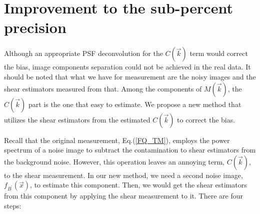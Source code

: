 \documentclass[twocolumn]{aastex62}
\begin{document}
\section{Improvement to the sub-percent precision}\label{sec:bias_corr}
Although an appropriate PSF deconvolution for the $C(\vec{k})$ term would correct the bias, image components separation could not be achieved in the real data. It should be noted that what we have for measurement are the noisy images and the shear estimators measured from that. Among the components of $M(\vec{k})$, the $C(\vec{k})$ part is the one that easy to estimate. We propose a new method that utilizes the shear estimators from the estimated $C(\vec{k})$ to correct the bias. 

Recall that the original measurement, Eq.(\ref{FQ_TM}), employs the power spectrum of a noise image to subtract the contamination to shear estimators from the background noise. However, this operation leaves an annoying term, $C(\vec{k})$, to the shear measurement. In our new method, we need a second noise image, $f_{B^{\prime}}(\vec{x})$, to estimate this component. Then, we would get the shear estimators from this component by applying the shear measurement to it. There are four steps:
\end{document}
